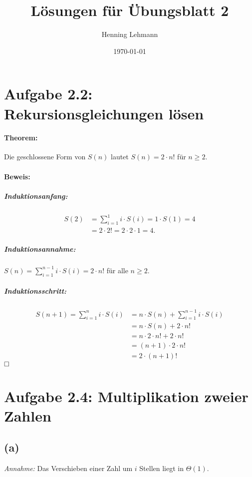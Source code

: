 \documentclass[a4paper,12pt]{article}
\title{Lösungen für Übungsblatt 2}
\author{Henning Lehmann}
\date{\today}
\begin{document}
\maketitle
\section*{Aufgabe 2.2: Rekursionsgleichungen lösen}

\paragraph{Theorem:}
Die geschlossene Form von $S(n)$ lautet $S(n)=2 \cdot n!$ für $n \geq 2$.

\paragraph{Beweis:}
\subparagraph{Induktionsanfang:} 
\begin{equation}
\begin{split}
S(2) &= \sum\limits_{i=1}^1 i \cdot S(i)=1 \cdot S(1)=4 \\
& = 2 \cdot 2!=2 \cdot 2 \cdot 1=4.
\end{split}
\end{equation}

\subparagraph{Induktionsannahme:}$S(n)=\sum\limits_{i=1}^{n-1}i \cdot S(i)=2 \cdot n!$ für alle $n\geq 2$.

\subparagraph{Induktionsschritt:}
\begin{equation}
\begin{split}
S(n+1)=\sum_{i=1}^ni \cdot S(i) &= n \cdot S(n) + \sum_{i=1}^{n-1}i \cdot S(i) \\
&=n\cdot S(n)+2\cdot n! \\
&=n\cdot 2\cdot n!+2\cdot n! \\
&=(n+1)\cdot 2\cdot n! \\
&=2\cdot (n+1)!
\end{split}
\end{equation}
$\hfill\square$

\clearpage

\section*{Aufgabe 2.4: Multiplikation zweier Zahlen}
\subsection*{(a)}
\textit{Annahme:} Das Verschieben einer Zahl um $i$ Stellen liegt in $\Theta(1)$.
\end{document}
